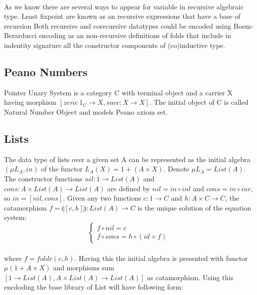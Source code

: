 \documentclass[11pt,oneside]{article}
\begin{document}
  \paragraph{}
  As we know there are several ways to appear for variable in recursive algebraic type.
  Least fixpoint are known as an recursive expressions that have a base of recursion
  Both recursive and corecursive datatypes could be encoded using Boem-Berarducci encoding
  as an non-recursive definitions of folds that include in indentity signature all the
  constructor components of (co)inductive type.

  \subsection{Peano Numbers}
  Pointer Unary System is a category C with terminal object
  and a carrier X having morphism $[zero: 1_C \rightarrow X,succ: X \rightarrow X]$.
  The initial object of C is called Natural Number Object and models Peano axiom set.

\newpage
  \subsection{Lists}
  The data type of lists over a given set A can be represented as the initial algebra
  $(\mu L_A, in)$ of the functor $L_A(X) = 1 + (A \times X)$. Denote $\mu L_A = List(A)$.
  The constructor functions $nil: 1 \rightarrow List(A)$ and
  $cons: A \times List(A) \rightarrow List(A)$ are defined by
  $nil = in \circ inl$ and $cons = in \circ inr$, so $in = [nil,cons]$.
  Given any two functions $c: 1 \rightarrow C$ and $h: A \times C \rightarrow C$,
  the catamorphism $f = \llparenthesis [c,h] \rrparenthesis : List(A) \rightarrow C$
  is the unique solution of the equation system:
\vspace{0.3cm}
$$
\begin{cases}
  f \circ nil  = c \\
  f \circ cons = h \circ (id \times f)
\end{cases}
$$

\paragraph{}
  where $f = foldr(c,h)$. Having this the initial algebra is presented with functor
  $\mu (1 + A \times X)$ and morphisms sum $[1 \rightarrow List(A), A \times List(A) \rightarrow List(A)]$
  as catamorphism. Using this encdoding the base library of List will have following form:
\end{document}
